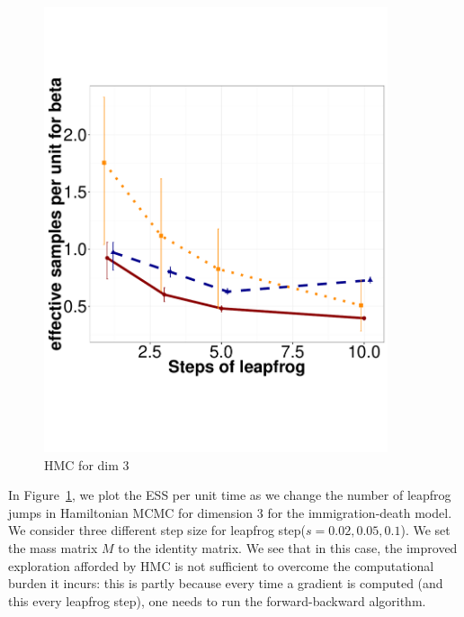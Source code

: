 \begin{figure}[H]
\begin{minipage}[hp]{0.45\linewidth}
    \includegraphics [width=0.90\textwidth, angle=0]{figs/h_beta.pdf}
      \end{minipage}
    \caption{HMC for dim 3}
    \label{fig:HMC_DIM_3}
  \end{figure}
In Figure~\ref{fig:HMC_DIM_3}, we plot the ESS per unit time as we change the 
number of leapfrog jumps in Hamiltonian MCMC for dimension $3$ for the 
immigration-death model. We consider 
three different step size for leapfrog step($s = 0.02, 0.05, 0.1$). 
We set the mass matrix $M$ to the identity matrix. We see that in this case,
the improved exploration afforded by HMC is not sufficient to overcome the 
computational burden it incurs: this is partly because every time a gradient is
computed (and this every leapfrog step), one needs to run the forward-backward algorithm.

